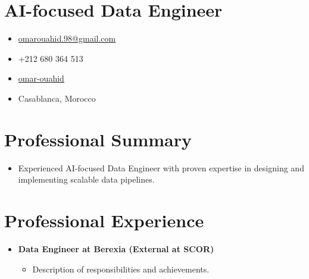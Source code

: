 \documentclass[11pt,a4paper,sans]{resume}
\begin{document}
\makeheader


\section{\textbf{AI-focused Data Engineer}}
\vspace{-0.5em} %

\begin{itemize}[leftmargin=0.5cm, label={}]
    \item \faEnvelope \hspace{0.2em} \href{mailto:omarouahid.98@gmail.com}{omarouahid.98@gmail.com}
    \item \faPhone \hspace{0.2em} +212 680 364 513
    \item \faLinkedin \hspace{0.2em} \href{https://www.linkedin.com/in/omar-ouahid}{omar-ouahid}
    \item \faMapMarker \hspace{0.2em} Casablanca, Morocco
\end{itemize}

\vspace{1em}

\section{\textbf{Professional Summary}}
\vspace{-0.5em}
\begin{itemize}[leftmargin=0.5cm, label={}]
    \item Experienced AI-focused Data Engineer with proven expertise in designing and implementing scalable data pipelines.
\end{itemize}

\vspace{1em}

\section{\textbf{Professional Experience}}
\vspace{-0.5em}
\begin{itemize}[leftmargin=0.5cm, label={}]
    \item \textbf{Data Engineer at Berexia (External at SCOR)}
    \begin{itemize}[leftmargin=1cm, label={}]
        \item Description of responsibilities and achievements.
    \end{itemize}
\end{itemize}
\end{document}
